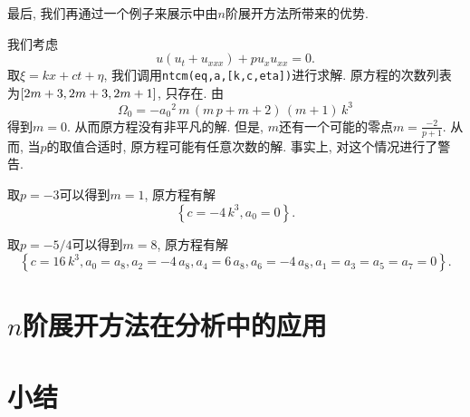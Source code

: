 最后, 我们再通过一个例子来展示中由$n$阶展开方法所带来的优势.

\begin{example}
我们考虑
\begin{equation}
    u(u_t+u_{xxx})+pu_x u_{xx}=0.
\end{equation}
取$\xi=kx+ct+\eta$, 我们调用\verb|ntcm(eq,a,[k,c,eta])|进行求解. 原方程的次数列表为$\left[2m+3,2m+3,2m+1\right]$, 只存在\BPthree{}. 由
\begin{equation}
    \Omega_0=-{{{a}_{0}}}^{2}\,m\,\left( m\,p+m+2\right) \,\left( m+1\right) \,{k}^{3}
\end{equation}
得到$m=0$. 从而原方程没有非平凡的解. 但是, $m$还有一个可能的零点$m=\frac{-2}{p+1}$. 从而, 当$p$的取值合适时, 原方程可能有任意次数的解. 事实上, 对这个情况进行了警告. 

取$p=-3$可以得到$m=1$, 原方程有解 
\begin{equation}
    \left\{ c=-4\,{k}^{3},{{a}_{0}}=0\right\} .
\end{equation}

取$p=-5/4$可以得到$m=8$, 原方程有解 
\begin{equation}
    \left\{ c=16\,{k}^{3},{{a}_{0}}={{a}_{8}},{{a}_{2}}=-4\,{{a}_{8}},{{a}_{4}}=6\,{{a}_{8}},{{a}_{6}}=-4\,{{a}_{8}},a_1=a_3=a_5=a_7=0\right\} .
\end{equation}
\end{example}

\section{$n$阶展开方法在\Painleve{}分析中的应用}
\section{小结}
